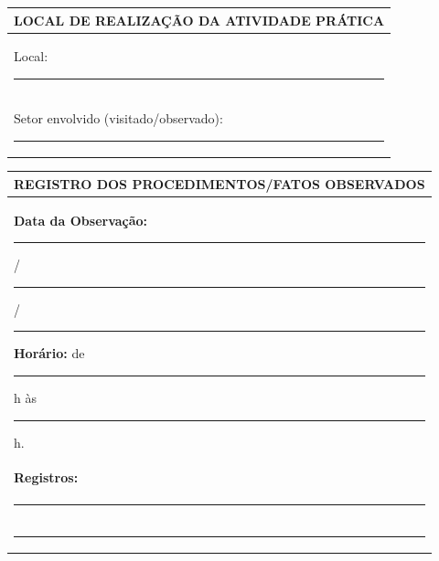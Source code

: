 \documentclass[12pt,a4paper]{article}
\begin{document}
\begin{center}
\vspace{0.12cm}


\noindent
\begin{tabularx}{\textwidth}{|X|}
\hline

\multicolumn{1}{|c|}{
    \fontsize{9}{10}\selectfont
    \textbf{LOCAL DE REALIZAÇÃO DA ATIVIDADE PRÁTICA}
}
\\[-2pt]
\hline

\fontsize{8.5}{9.5}\selectfont

Local:
\hspace{0.03cm}\rule{13.3cm}{0.1pt}
\\[1pt]

Setor envolvido (visitado/observado):
\hspace{0.03cm}\rule{9.2cm}{0.1pt}
\\[-2pt]

\hline
\end{tabularx}

\vspace{0.12cm}


\noindent
\begin{tabularx}{\textwidth}{|X|}
\hline

\multicolumn{1}{|c|}{
    \fontsize{9}{10}\selectfont
    \textbf{REGISTRO DOS PROCEDIMENTOS/FATOS OBSERVADOS}
}
\\[-2pt]
\hline

\fontsize{8.5}{9.5}\selectfont

\textbf{Data da Observação:}
\hspace{0.03cm}
\rule{1.3cm}{0.1pt}
/
\rule{1.3cm}{0.1pt}
/
\rule{1.3cm}{0.1pt}
\hfill
\textbf{Horário:}
\hspace{0.03cm}
de
\rule{0.6cm}{0.1pt}
h às
\rule{0.6cm}{0.1pt}
h.
\\[2pt]

\textbf{Registros:}
\\[1pt]

\rule{\linewidth}{0.1pt}
\\[2pt]

\rule{\linewidth}{0.1pt}
\\[2pt]


\end{tabularx}
\end{center}
\end{document}
